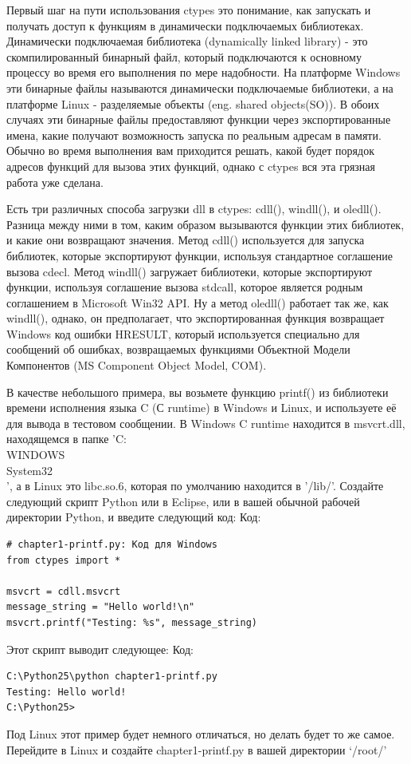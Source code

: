 \documentclass[12pt]{book}
\begin{document}
Первый шаг на пути использования ctypes это понимание, как запускать и получать доступ к функциям в динамически подключаемых библиотеках. Динамически подключаемая библиотека (dynamically linked library) - это скомпилированный бинарный файл, который подключаются к основному процессу во время его выполнения по мере надобности. На платформе Windows эти бинарные файлы называются динамически подключаемые библиотеки, а на платформе Linux - разделяемые объекты (eng. shared objects(SO)). В обоих случаях эти бинарные файлы предоставляют функции через экспортированные имена, какие получают возможность запуска по реальным адресам в памяти. Обычно во время выполнения вам приходится решать, какой будет порядок адресов функций для вызова этих функций, однако с ctypes вся эта грязная работа уже сделана.

Есть три различных способа загрузки dll в ctypes: cdll(), windll(), и oledll(). Разница между ними в том, каким образом вызываются функции этих библиотек, и какие они возвращают значения. Метод cdll() используется для запуска библиотек, которые экспортируют функции, используя стандартное соглашение вызова cdecl. Метод windll() загружает библиотеки, которые экспортируют функции, используя соглашение вызова stdcall, которое является родным соглашением в Microsoft Win32 API. Ну а метод oledll() работает так же, как windll(), однако, он предполагает, что экспортированная функция возвращает Windows код ошибки HRESULT, который используется специально для сообщений об ошибках, возвращаемых функциями Объектной Модели Компонентов (MS Component Object Model, COM).

В качестве небольшого примера, вы возьмете функцию printf() из библиотеки времени исполнения языка C (С runtime) в Windows и Linux, и используете её для вывода в тестовом сообщении. В Windows C runtime находится в msvcrt.dll, находящемся в папке 'C:\\WINDOWS\\System32\\', а в Linux это libc.so.6, которая по умолчанию находится в '/lib/'. Создайте следующий скрипт Python или в Eclipse, или в вашей обычной рабочей директории Python, и введите следующий код:
Код:
\begin{lstlisting}
# chapter1-printf.py: Код для Windows
from ctypes import *

msvcrt = cdll.msvcrt
message_string = "Hello world!\n"
msvcrt.printf("Testing: %s", message_string)
\end{lstlisting}
Этот скрипт выводит следующее:
Код:
\begin{lstlisting}
C:\Python25\python chapter1-printf.py
Testing: Hello world!
C:\Python25>
\end{lstlisting}
Под Linux этот пример будет немного отличаться, но делать будет то же самое. Перейдите в Linux и создайте chapter1-printf.py в вашей директории `/root/'
\end{document}
